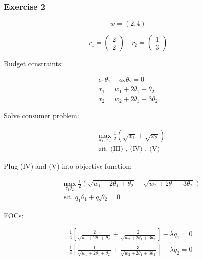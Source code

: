 {
\subsubsection*{Exercise 2}

$$
w=(2,4)
$$

\begin{enumerate}[label=(\alph*)]
{\item 
$$
r_{1}=\left(\begin{array}{l}
2 \\
2
\end{array}\right) \quad r_{2}=\left(\begin{array}{l}
1 \\
3
\end{array}\right)
$$

Budget constraints:

\begin{align*}
a_{1} \theta_{1}+a_{2} \theta_{2}=0  \tag{III}\\
x_{1}=w_{1}+2 \theta_{1}+\theta_{2}  \tag{IV}\\
x_{2}=w_{2}+2 \theta_{1}+3 \theta_{2} \tag{V}
\end{align*}

Solve consumer problem:

$$
\begin{aligned}
& \max _{x_{1}, x_{2}} \frac{1}{2}\left(\sqrt{x_{1}}+\sqrt{x_{2}}\right) \\
& \text { sit. (III) , (IV) , (V) }
\end{aligned}
$$

Plug (IV) and (V) into objective function:

$$
\begin{aligned}
& \max _{\theta_{1} \theta_{2}} \frac{1}{2}\left(\sqrt{w_{1}+2 \theta_{1}+\theta_{2}}+\sqrt{w_{2}+2 \theta_{1}+3 \theta_{2}}\right) \\
& \text { sit. } q_{1} \theta_{1}+q_{2} \theta_{2}=0
\end{aligned}
$$

FOCs:

$$
\begin{aligned}
& \frac{1}{4}\left[\frac{2}{\sqrt{w_{1}+2 \theta_{1}+\theta_{2}}}+\frac{2}{\sqrt{w_{2}+2 \theta_{1}+3 \theta_{2}}}\right]-\lambda q_{1}=0 \\
& \frac{1}{4}\left[\frac{1}{\sqrt{w_{1}+2 \theta_{1}+\theta_{2}}}+\frac{3}{\sqrt{w_{2}+2 \theta_{1}+3 \theta_{2}}}\right]-\lambda q_{2}=0
\end{aligned}
$$

}
\end{enumerate}}
